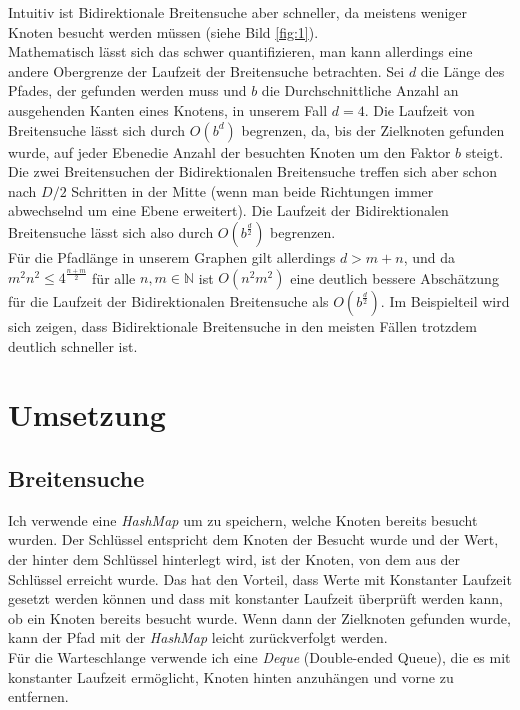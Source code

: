 \documentclass[a4paper,10pt,ngerman]{scrartcl}
\begin{document}
    Intuitiv ist Bidirektionale Breitensuche aber schneller, da meistens weniger Knoten besucht werden müssen (siehe Bild \ref{fig:1}). \\
    Mathematisch lässt sich das schwer quantifizieren, man kann allerdings eine andere Obergrenze der Laufzeit der Breitensuche betrachten. Sei $d$ die Länge des Pfades, der gefunden werden muss und $b$ die Durchschnittliche Anzahl an ausgehenden Kanten eines Knotens, in unserem Fall $d = 4$.
    Die Laufzeit von Breitensuche lässt sich durch $O(b^d)$ begrenzen, da, bis der Zielknoten gefunden wurde, auf jeder \glqq Ebene\grqq die Anzahl der besuchten Knoten um den Faktor $b$ steigt.\\
    Die zwei Breitensuchen der Bidirektionalen Breitensuche treffen sich aber schon nach $D/2$ Schritten in der Mitte (wenn man beide Richtungen immer abwechselnd um eine Ebene erweitert).
    Die Laufzeit der Bidirektionalen Breitensuche lässt sich also durch $O(b^{\frac d 2})$ begrenzen. \\
    Für die Pfadlänge in unserem Graphen gilt allerdings $d > m + n$, und da $m^2 n^2  \le 4^{\frac {n + m} 2}$ für alle $n, m \in \mathbb N$ ist $O(n^2 m^2)$ eine deutlich bessere Abschätzung für die Laufzeit der Bidirektionalen Breitensuche als $O(b^{\frac d 2})$.
    Im Beispielteil wird sich zeigen, dass Bidirektionale Breitensuche in den meisten Fällen trotzdem deutlich schneller ist.

    \section{Umsetzung}
    \subsection{Breitensuche}
    Ich verwende eine \textit{HashMap} um zu speichern, welche Knoten bereits besucht wurden. Der Schlüssel entspricht dem Knoten der Besucht wurde und der Wert, der hinter dem Schlüssel hinterlegt wird, ist der Knoten, von dem aus der Schlüssel erreicht wurde. Das hat den Vorteil, dass Werte mit Konstanter Laufzeit gesetzt werden können und dass mit konstanter Laufzeit überprüft werden kann, ob ein Knoten bereits besucht wurde.
    Wenn dann der Zielknoten gefunden wurde, kann der Pfad mit der \textit{HashMap} leicht zurückverfolgt werden. \\
    Für die Warteschlange verwende ich eine \textit{Deque} (Double-ended Queue), die es mit konstanter Laufzeit ermöglicht, Knoten hinten anzuhängen und vorne zu entfernen.
\end{document}
